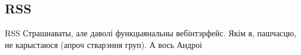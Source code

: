 \documentclass[ignorenonframetext,hyperref={pdftex,unicode}]{beamer}
\begin{document}
\subsection{RSS}
\begin{frame}{RSS}
	Страшнаваты, але даволі функцыянальны вебінтэрфейс. Якім я, пашчасцю, не карыстаюся (апроч стварэння груп). А вось Андроі
\end{frame}
\end{document}
